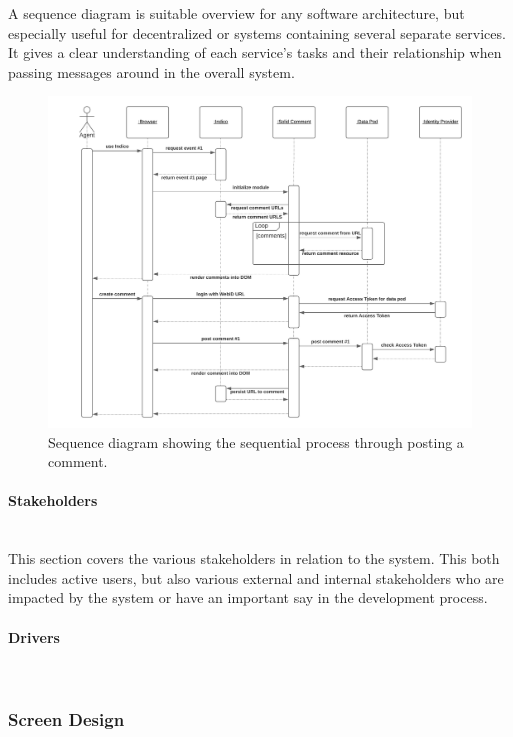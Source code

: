 A sequence diagram is suitable overview for any software architecture, but especially useful for decentralized or systems containing several separate services. It gives a clear understanding of each service’s tasks and their relationship when passing messages around in the overall system.

\begin{figure}[H]
    \centering
    \includegraphics[width=\textwidth]{prototype/graphs/poc-comment-sequence_diagram.png}
    \caption{Sequence diagram showing the sequential process through posting a comment.}
    \label{fig:poc-comment-sequence_diagram}
\end{figure}

\paragraph{Stakeholders}\mbox{}\\

This section covers the various stakeholders in relation to the system. This both includes active users, but also various external and internal stakeholders who are impacted by the system or have an important say in the development process.

\paragraph{Drivers}\mbox{}\\

\subsubsection{Screen Design}\mbox{}\\

